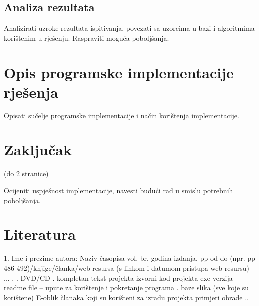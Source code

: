 \documentclass[times, utf8, diplomski]{fer}
\begin{document}
\section{Analiza rezultata}

Analizirati uzroke rezultata ispitivanja, povezati sa uzorcima u bazi i algoritmima korištenim u rješenju. Raspraviti moguća poboljšanja.

\chapter{Opis programske implementacije rješenja}

Opisati sučelje programske implementacije i način korištenja implementacije.


\chapter{Zaključak}

(do 2 stranice)

Ocijeniti uspješnost implementacije, navesti budući rad u smislu potrebnih poboljšanja. 


\chapter{Literatura}

1. Ime i prezime autora: Naziv časopisa vol. br. godina izdanja, pp od-do (npr. pp 486-492)/knjige/članka/web resursa (s linkom i datumom pristupa web resursu)
...
.
.
DVD/CD  
.
kompletan tekst projekta
izvorni kod projekta
exe verzija
readme file – upute za korištenje i pokretanje programa
.
baze slika (sve koje su korištene)
E-oblik članaka koji su korišteni za izradu projekta
primjeri obrade
..


\end{document}
